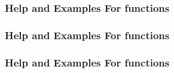\documentclass[11pt,canadian,english]{beamer}
\def\lyxframeend{} %
\begin{document}
\begin{frame}[containsverbatim]
\frametitle{Help and Examples For functions}

\end{frame}

\begin{frame}[containsverbatim]
\frametitle{Help and Examples For functions}

\end{frame}

\begin{frame}[containsverbatim]
\frametitle{Help and Examples For functions}

\end{frame}


\lyxframeend{}
\end{document}
